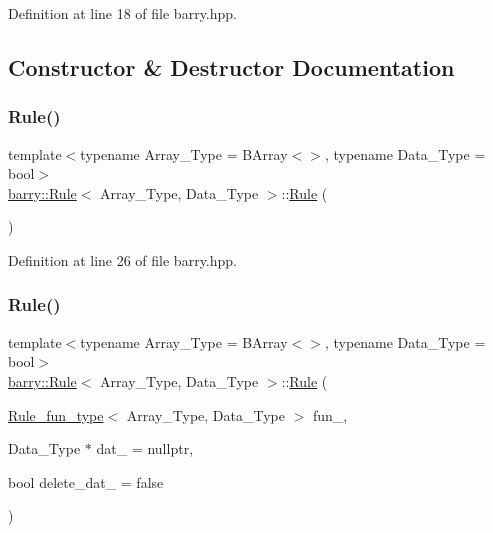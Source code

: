 Definition at line 18 of file barry.\+hpp.



\subsection{Constructor \& Destructor Documentation}
\mbox{\label{classbarry_1_1_rule_aa9d79df22874f000c8f4dd46b58cc157}} 
\subsubsection{\texorpdfstring{Rule()}{Rule()}\hspace{0.1cm}{\footnotesize\ttfamily [1/2]}}
{\footnotesize\ttfamily template$<$typename Array\+\_\+\+Type  = B\+Array$<$$>$, typename Data\+\_\+\+Type  = bool$>$ \\
\hyperlink{classbarry_1_1_rule}{barry\+::\+Rule}$<$ Array\+\_\+\+Type, Data\+\_\+\+Type $>$\+::\hyperlink{classbarry_1_1_rule}{Rule} (\begin{DoxyParamCaption}{ }\end{DoxyParamCaption})\hspace{0.3cm}{\ttfamily [inline]}}



Definition at line 26 of file barry.\+hpp.

\mbox{\label{classbarry_1_1_rule_a2d63309b0ff8cd5d2c4827b9daf03b3a}} 
\subsubsection{\texorpdfstring{Rule()}{Rule()}\hspace{0.1cm}{\footnotesize\ttfamily [2/2]}}
{\footnotesize\ttfamily template$<$typename Array\+\_\+\+Type  = B\+Array$<$$>$, typename Data\+\_\+\+Type  = bool$>$ \\
\hyperlink{classbarry_1_1_rule}{barry\+::\+Rule}$<$ Array\+\_\+\+Type, Data\+\_\+\+Type $>$\+::\hyperlink{classbarry_1_1_rule}{Rule} (\begin{DoxyParamCaption}\item[{\hyperlink{namespacebarry_aefd7e6d4ba228e2ce1074d075c512178}{Rule\+\_\+fun\+\_\+type}$<$ Array\+\_\+\+Type, Data\+\_\+\+Type $>$}]{fun\+\_\+,  }\item[{Data\+\_\+\+Type $\ast$}]{dat\+\_\+ = {\ttfamily nullptr},  }\item[{bool}]{delete\+\_\+dat\+\_\+ = {\ttfamily false} }\end{DoxyParamCaption})\hspace{0.3cm}{\ttfamily [inline]}}



